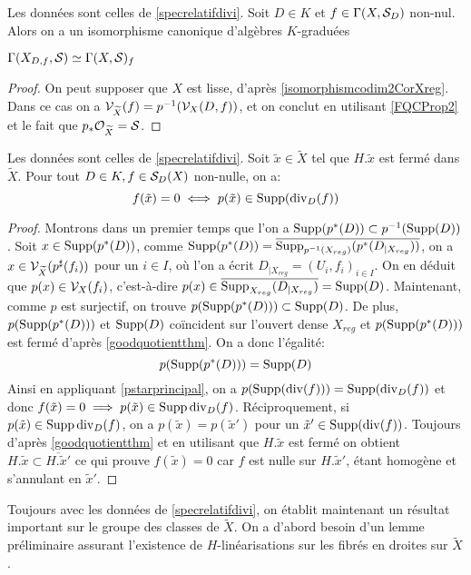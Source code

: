 \begin{prop}\label{CoxIsomorphismLocalisation}
Les données sont celles de \ref{specrelatifdivi}. Soit $D\in K$ et $f\in\Gamma(X,\mathcal{S}_D)$ non-nul. Alors on a un isomorphisme canonique d'algèbres $K$-graduées
\begin{center}
$\Gamma(X_{D,f},\mathcal{S})\simeq \Gamma(X,\mathcal{S})_f$
\end{center}
\end{prop}
\begin{proof}
On peut supposer que $X$ est lisse, d'après \ref{isomorphismcodim2CorXreg}. Dans ce cas on a $\mathcal{V}_{\widetilde{X}}(f)=p^{-1}(\mathcal{V}_X(D,f))$, et on conclut en utilisant \ref{FQCProp2} et le fait que $p_*\mathcal{O}_{\widetilde{X}}=\mathcal{S}$.
\end{proof}

\begin{cor}\label{zerosspecrelatif}
Les données sont celles de \ref{specrelatifdivi}. Soit $\tilde{x}\in\widetilde{X}$ tel que $H.\tilde{x}$ est fermé dans $\widetilde{X}$. Pour tout $D\in K, f\in \mathcal{S}_D(X)$ non-nulle, on a:
$$f(\tilde{x})=0 \iff p(\tilde{x})\in \operatorname{Supp}(\operatorname{div}_D(f))$$
\end{cor}
\begin{proof}
Montrons dans un premier temps que l'on a $\operatorname{Supp}(p^*(D))\subset p^{-1}(\operatorname{Supp}(D))$. Soit $x\in \operatorname{Supp} (p^*(D))$, comme $\operatorname{Supp}(p^*(D))=\overline{\operatorname{Supp}_{p^{-1}(X_{reg})}(p^*(D_{|X_{reg}}))}$, on a $x\in\mathcal{V}_{\widetilde{X}}(p^\sharp(f_i))$ pour un $i\in I$, où l'on a écrit $D_{|X_{reg}}=(U_i, f_i)_{i\in I}$. On en déduit que $p(x)\in \mathcal{V}_X(f_i)$, c'est-à-dire $p(x)\in \overline{\operatorname{Supp}_{X_{reg}}(D_{|X_{reg}})}=\operatorname{Supp}(D)$. Maintenant, comme $p$ est surjectif, on trouve $p(\operatorname{Supp}(p^*(D)))\subset \operatorname{Supp}(D)$. De plus, $p(\operatorname{Supp}(p^*(D)))$ et $\operatorname{Supp}(D)$ coïncident sur l'ouvert dense $X_{reg}$ et $p(\operatorname{Supp}(p^*(D)))$ est fermé d'après \ref{goodquotientthm}. On a donc l'égalité:$$p(\operatorname{Supp}(p^*(D)))=\operatorname{Supp}(D)$$
Ainsi en appliquant \ref{pstarprincipal}, on a $p(\operatorname{Supp}(\operatorname{div}(f)))= \operatorname{Supp}(\operatorname{div}_D(f))$ et donc $f(\tilde{x})=0 \implies p(\tilde{x})\in\operatorname{Supp} \operatorname{div}_D(f)$. Réciproquement, si $p(\tilde{x})\in\operatorname{Supp} \operatorname{div}_D(f)$, on a $p(\tilde{x})=p(\tilde{x}')$ pour un $\tilde{x}'\in \operatorname{Supp}(\operatorname{div}(f))$. Toujours d'après \ref{goodquotientthm} et en utilisant que $H.\tilde{x}$ est fermé on obtient $H.\tilde{x}\subset\overline{H.\tilde{x}'}$ ce qui prouve $f(\tilde{x})=0$ car $f$ est nulle sur $H.\tilde{x}'$, étant homogène et s'annulant en $\tilde{x}'$.
\end{proof}

Toujours avec les données de \ref{specrelatifdivi}, on établit maintenant un résultat important sur le groupe des classes de $\widetilde{X}$. On a d'abord besoin d'un lemme préliminaire assurant l'existence de $H$-linéarisations sur les fibrés en droites sur $\widetilde{X}$.

